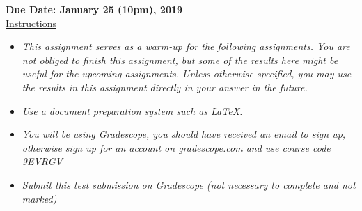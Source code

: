\documentclass[12pt]{article}
\theoremstyle{definition}
\begin{document}
\fancyhead{}
\fancyfoot{}


\vspace{1cm}

{\bf Due Date: January 25 (10pm), 2019}\\

\vspace{-0.5cm}
\underline{Instructions}
\renewcommand{\labelitemi}{\textbullet}
\begin{itemize}
\item \emph{This assignment serves as a warm-up for the following assignments. You are not obliged to finish this assignment, but some of the results here might be useful for the upcoming assignments. Unless otherwise specified, you may use the results in this assignment directly in your answer in the future.}
\item \emph{Use a document preparation system such as LaTeX.}
\item \emph{You will be using Gradescope, you should have received an email to sign up, otherwise sign up for an account on gradescope.com and use course code 9EVRGV}
\item \emph{Submit this test submission on Gradescope (not necessary to complete and not marked)}
\end{itemize}





\end{document}
